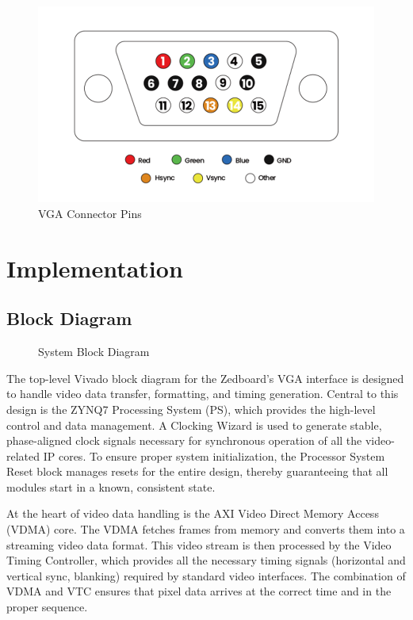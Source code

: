 \documentclass{article}
\begin{document}
\begin{figure}[H]
    \centering
    \includegraphics[width=0.5\linewidth]{VGA Connector Pins.png}
    \caption{VGA Connector Pins}
    \label{fig:VGA Pins}
\end{figure}

\section{Implementation}
\subsection{Block Diagram}

\begin{figure}[h!]
    \centering
    
    \caption{System Block Diagram}
    \label{fig:block diagram}
\end{figure}

The top-level Vivado block diagram \cite{noauthor_vipinkmenonvga_nodate}\cite{noauthor_using_nodate} for the Zedboard’s VGA interface is designed to handle video data transfer, formatting, and timing generation. Central to this design is the ZYNQ7 Processing System (PS), which provides the high-level control and data management. A Clocking Wizard is used to generate stable, phase-aligned clock signals necessary for synchronous operation of all the video-related IP cores. To ensure proper system initialization, the Processor System Reset block manages resets for the entire design, thereby guaranteeing that all modules start in a known, consistent state.

At the heart of video data handling is the AXI Video Direct Memory Access (VDMA) core. The VDMA fetches frames from memory and converts them into a streaming video data format. This video stream is then processed by the Video Timing Controller, which provides all the necessary timing signals (horizontal and vertical sync, blanking) required by standard video interfaces. The combination of VDMA and VTC ensures that pixel data arrives at the correct time and in the proper sequence.
\end{document}
